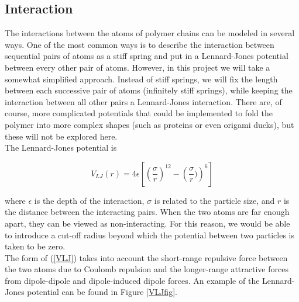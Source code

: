 \documentclass{article}
\begin{document}
\begin{multicols}{2}
\subsection{Interaction}

The interactions between the atoms of polymer chains can be modeled in several ways.  One of the most common ways is to describe the interaction between sequential pairs of atoms as a stiff spring and put in a Lennard-Jones potential between every other pair of atoms.  \cite{PhilNotes}  However, in this project we will take a somewhat simplified approach.  Instead of stiff springs, we will fix the length between each successive pair of atoms (infinitely stiff springs), while keeping the interaction between all other pairs a Lennard-Jones interaction.  There are, of course, more complicated potentials that could be implemented to fold the polymer into more complex shapes (such as proteins or even origami ducks), but these will not be explored here.\\

The Lennard-Jones potential is 

\begin{equation}
\label{VLJ}
V_{LJ}(r) = 4\epsilon \left [ \left ( \frac{\sigma}{r} \right ) ^{12} - \left ( \frac{\sigma}{r}) \right ) ^6 \right ]
\end{equation}

\noindent where $\epsilon$ is the depth of the interaction, $\sigma$ is related to the particle size, and $r$ is the distance between the interacting pairs.  When the two atoms are far enough apart, they can be viewed as non-interacting.  For this reason, we would be able to introduce a cut-off radius beyond which the potential between two particles is taken to be zero.  \\

The form of (\ref{VLJ}) takes into account the short-range repulsive force between the two atoms due to Coulomb repulsion and the longer-range attractive forces from dipole-dipole and dipole-induced dipole forces.  \cite{verlet}  An example of the Lennard-Jones potential can be found in Figure \ref{VLJfig}.


\end{multicols}
\end{document}
